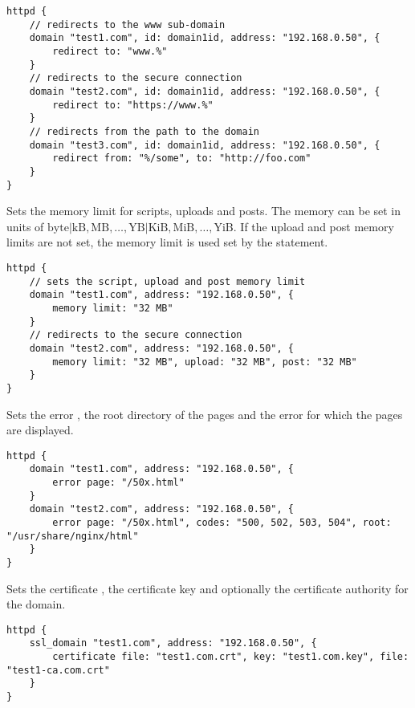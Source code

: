 \begin{lstlisting}[style=Java]
httpd {
    // redirects to the www sub-domain
    domain "test1.com", id: domain1id, address: "192.168.0.50", {
        redirect to: "www.%"
    }
    // redirects to the secure connection
    domain "test2.com", id: domain1id, address: "192.168.0.50", {
        redirect to: "https://www.%"
    }
    // redirects from the path to the domain
    domain "test3.com", id: domain1id, address: "192.168.0.50", {
        redirect from: "%/some", to: "http://foo.com"
    }
}
\end{lstlisting}


Sets the memory limit for scripts, uploads and posts. The memory 
can be set in units of $\mathrm{byte|kB,MB,\dots,YB|KiB,MiB,\dots,YiB}$.
If the upload and post memory limits are not set, the memory limit is used set
by the  statement.

\begin{lstlisting}[style=Java]
httpd {
    // sets the script, upload and post memory limit
    domain "test1.com", address: "192.168.0.50", {
        memory limit: "32 MB"
    }
    // redirects to the secure connection
    domain "test2.com", address: "192.168.0.50", {
        memory limit: "32 MB", upload: "32 MB", post: "32 MB"
    }
}
\end{lstlisting}


Sets the error , the root directory  of the pages and 
the error  for which the pages are displayed.

\begin{lstlisting}[style=Java]
httpd {
    domain "test1.com", address: "192.168.0.50", {
        error page: "/50x.html"
    }
    domain "test2.com", address: "192.168.0.50", {
        error page: "/50x.html", codes: "500, 502, 503, 504", root: "/usr/share/nginx/html"
    }
}
\end{lstlisting}


Sets the certificate , the certificate key  and optionally the
certificate authority  for the domain.

\begin{lstlisting}[style=Java]
httpd {
    ssl_domain "test1.com", address: "192.168.0.50", {
        certificate file: "test1.com.crt", key: "test1.com.key", file: "test1-ca.com.crt"
    }
}
\end{lstlisting}

